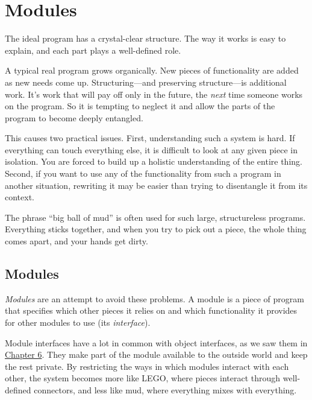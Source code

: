 \chapter{Modules}\label{modules}


The ideal program has a crystal-clear structure. The way it works is easy to explain, and each part plays a well-defined role.

A typical real program grows organically. New pieces of functionality are added as new needs come up. Structuring—and preserving structure—is additional work. It's work that will pay off only in the future, the \emph{next} time someone works on the program. So it is tempting to neglect it and allow the parts of the program to become deeply entangled.

This causes two practical issues. First, understanding such a system is hard. If everything can touch everything else, it is difficult to look at any given piece in isolation. You are forced to build up a holistic understanding of the entire thing. Second, if you want to use any of the functionality from such a program in another situation, rewriting it may be easier than trying to disentangle it from its context.

The phrase ``big ball of mud'' is often used for such large, structureless programs. Everything sticks together, and when you try to pick out a piece, the whole thing comes apart, and your hands get dirty.

\section{Modules}

\emph{Modules} are an attempt to avoid these problems. A module is a piece of program that specifies which other pieces it relies on and which functionality it provides for other modules to use (its \emph{interface}).

Module interfaces have a lot in common with object interfaces, as we saw them in \hyperref[object.interface]{Chapter 6}. They make part of the module available to the outside world and keep the rest private. By restricting the ways in which modules interact with each other, the system becomes more like LEGO, where pieces interact through well-defined connectors, and less like mud, where everything mixes with everything.

